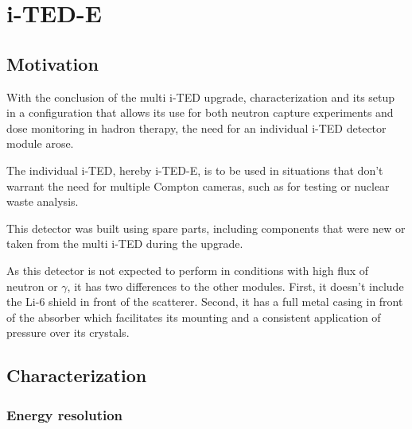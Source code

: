 \chapter{i-TED-E}\label{ch:e}

\section{Motivation}\label{sec:motivation-e}

With the conclusion of the multi \ac{i-TED} upgrade, characterization and its setup in a configuration that allows its use for both neutron capture experiments and dose monitoring in hadron therapy, the need for an individual \ac{i-TED} detector module arose.

The individual \ac{i-TED}, hereby \ac{i-TED}-E, is to be used in situations that don't warrant the need for multiple Compton cameras, such as for testing or nuclear waste analysis.

This detector was built using spare parts, including components that were new or taken from the multi \ac{i-TED} during the upgrade.

As this detector is not expected to perform in conditions with high flux of neutron or $\gamma$, it has two differences to the other modules. First, it doesn't include the Li-6 shield in front of the scatterer. Second, it has a full metal casing in front of the absorber which facilitates its mounting and a consistent application of pressure over its crystals.

\section{Characterization}\label{sec:characterization-e}

\subsection{Energy resolution}

